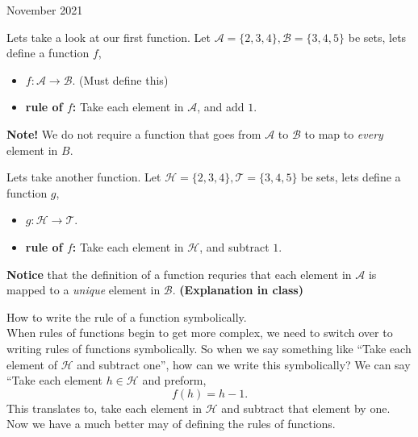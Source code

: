 \documentclass[12pt,oneside]{book} %
\begin{document}
\begin{lec}{November 2021}
	\begin{ex}
		Lets take a look at our first function. Let $\mathcal{A} = \{2,3,4\}, \mathcal{B} = \{3,4,5\} $ be sets, lets define a
		function $f$,
		\begin{itemize}
			\item $f \colon \mathcal{A} \to \mathcal{B}$. (Must define this)
			\item \textbf{rule of $f$:} Take each element in $\mathcal{A}$, and add $1$.
		\end{itemize}
	\end{ex}

	\begin{rem}
			\textbf{Note!} We do not require a function that goes from $\mathcal{A}$ to $\mathcal{B}$ to map to \emph{every} element in
			$B$.
	\end{rem}

	\begin{ex}
		Lets take another function. Let $\mathcal{H} = \{2,3,4\}, \mathcal{T} = \{3,4,5\} $ be sets, lets define a
		function $g$,
		\begin{itemize}
			\item $g \colon \mathcal{H} \to \mathcal{T}$.
			\item \textbf{rule of $f$:} Take each element in $\mathcal{H}$, and subtract $1$.
		\end{itemize}
	\end{ex}

	\begin{rem}
			\textbf{Notice} that the definition of a function requries that each element in $\mathcal{A}$ is mapped to a
			\emph{unique} element in $\mathcal{B}$. \textbf{(Explanation in class)}
	\end{rem}

	\newpage

	\begin{notn}
			How to write the rule of a function symbolically.\\
			When rules of functions begin to get more complex, we need to switch over to writing rules of functions symbolically.
			So when we say something like ``Take each element of $\mathcal{H}$ and subtract one'', how can we write this symbolically?
			We can say ``Take each element $h\in \mathcal{H}$ and preform,
						\[
						f(h) = h - 1
						.\] 
			This translates to, take each element in $\mathcal{H}$ and subtract that element by one. Now we have a much better may of defining the
			rules of functions.
	\end{notn}


\end{lec}
\end{document}

